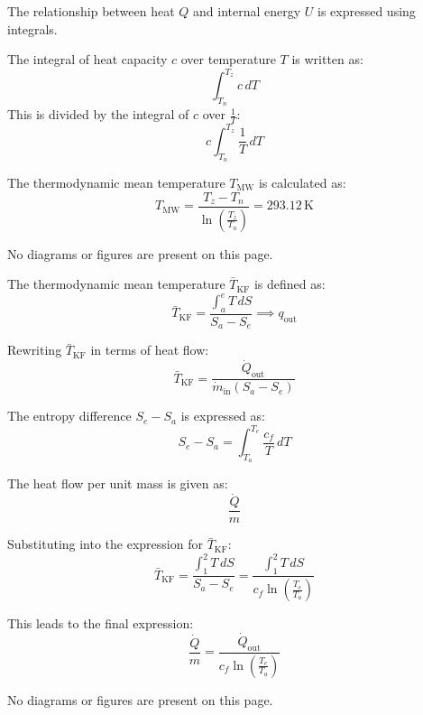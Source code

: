 The relationship between heat \( Q \) and internal energy \( U \) is expressed using integrals.  

The integral of heat capacity \( c \) over temperature \( T \) is written as:  
\[
\int_{T_n}^{T_z} c \, dT
\]  
This is divided by the integral of \( c \) over \( \frac{1}{T} \):  
\[
c \int_{T_n}^{T_z} \frac{1}{T} \, dT
\]  

The thermodynamic mean temperature \( T_{\text{MW}} \) is calculated as:  
\[
T_{\text{MW}} = \frac{T_z - T_n}{\ln\left(\frac{T_z}{T_n}\right)} = 293.12 \, \text{K}
\]  

No diagrams or figures are present on this page.

The thermodynamic mean temperature \( \bar{T}_{\text{KF}} \) is defined as:  
\[
\bar{T}_{\text{KF}} = \frac{\int_a^e T \, dS}{S_a - S_e} \implies q_{\text{out}}
\]  

Rewriting \( \bar{T}_{\text{KF}} \) in terms of heat flow:  
\[
\bar{T}_{\text{KF}} = \frac{\dot{Q}_{\text{out}}}{\dot{m}_{\text{in}} (S_a - S_e)}
\]  

The entropy difference \( S_e - S_a \) is expressed as:  
\[
S_e - S_a = \int_{T_a}^{T_e} \frac{c_f}{T} \, dT
\]  

The heat flow per unit mass is given as:  
\[
\frac{\dot{Q}}{m}
\]  

Substituting into the expression for \( \bar{T}_{\text{KF}} \):  
\[
\bar{T}_{\text{KF}} = \frac{\int_1^2 T \, dS}{S_a - S_e} = \frac{\int_1^2 T \, dS}{c_f \ln \left( \frac{T_e}{T_a} \right)}
\]  

This leads to the final expression:  
\[
\frac{\dot{Q}}{m} = \frac{\dot{Q}_{\text{out}}}{c_f \ln \left( \frac{T_e}{T_a} \right)}
\]  

No diagrams or figures are present on this page.